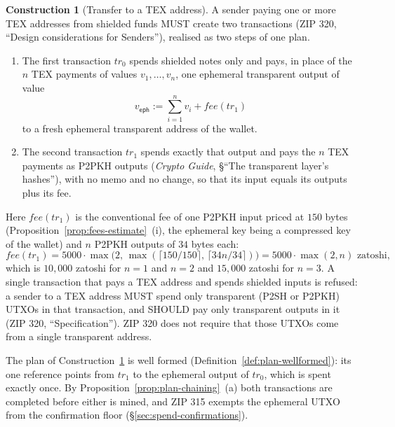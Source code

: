 \documentclass[11pt,a4paper]{article}
\theoremstyle{definition}
\newtheorem{construction}[theorem]{Construction}
\begin{document}
\begin{construction}[Transfer to a TEX address]\label{def:tex-transfer}
A sender paying one or more TEX addresses from shielded funds MUST create
two transactions (ZIP 320, ``Design considerations for Senders''), realised
as two steps of one plan.
\begin{enumerate}[label=(\arabic*)]
\item The first transaction $\mathit{tr}_0$ spends shielded notes only and
  pays, in place of the $n$ TEX payments of values $v_1, \dots, v_n$, one
  ephemeral transparent output of value
  \[
    v_{\mathsf{eph}} := \textstyle\sum_{i=1}^{n} v_i
      + \mathit{fee}(\mathit{tr}_1)
  \]
  to a fresh ephemeral transparent address of the wallet.
\item The second transaction $\mathit{tr}_1$ spends exactly that output and
  pays the $n$ TEX payments as P2PKH outputs (\emph{Crypto Guide},
  \S``The transparent layer's hashes''), with no memo and no change, so that
  its input equals its outputs plus its fee.
\end{enumerate}
Here $\mathit{fee}(\mathit{tr}_1)$ is the conventional fee of one P2PKH
input priced at $150$ bytes (Proposition~\ref{prop:fees-estimate}~(i), the
ephemeral key being a compressed key of the wallet) and $n$ P2PKH outputs of
$34$ bytes each:
\[
  \mathit{fee}(\mathit{tr}_1) = 5000 \cdot \max\bigl(2,\,
    \max(\lceil 150/150 \rceil,\, \lceil 34n/34 \rceil)\bigr)
  = 5000 \cdot \max(2, n) \text{ zatoshi},
\]
which is $10{,}000$ zatoshi for $n = 1$ and $n = 2$ and $15{,}000$ zatoshi
for $n = 3$. A single transaction that pays a TEX address and spends
shielded inputs is refused: a sender to a TEX address MUST spend only
transparent (P2SH or P2PKH) UTXOs in that transaction, and SHOULD pay only
transparent outputs in it (ZIP 320, ``Specification''). ZIP 320 does not
require that those UTXOs come from a single transparent address.
\end{construction}

The plan of Construction~\ref{def:tex-transfer} is well formed
(Definition~\ref{def:plan-wellformed}): its one reference points from
$\mathit{tr}_1$ to the ephemeral output of $\mathit{tr}_0$, which is spent
exactly once. By Proposition~\ref{prop:plan-chaining}~(a) both
transactions are completed before either is mined, and ZIP 315 exempts the
ephemeral UTXO from the confirmation floor
(\S\ref{sec:spend-confirmations}).
\end{document}
